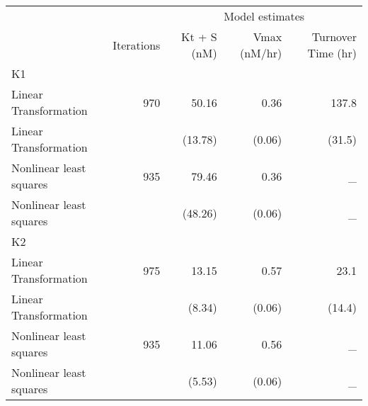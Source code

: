 \captionsetup[table]{labelformat=empty,skip=1pt}
\begin{longtable}{lrrrr}
\toprule
& & \multicolumn{3}{c}{Model estimates} \\ 
 \cmidrule(lr){3-5}
 & Iterations & Kt + S (nM) & Vmax (nM/hr) & Turnover Time (hr) \\ 
\midrule
\multicolumn{1}{l}{K1} \\ 
\midrule
Linear Transformation & 970 & 50.16 & 0.36 & 137.8 \\ 
Linear Transformation &  & (13.78) & (0.06) & (31.5) \\ 
Nonlinear least squares & 935 & 79.46 & 0.36 & _ \\ 
Nonlinear least squares &  & (48.26) & (0.06) & _ \\ 
\midrule
\multicolumn{1}{l}{K2} \\ 
\midrule
Linear Transformation & 975 & 13.15 & 0.57 & 23.1 \\ 
Linear Transformation &  & (8.34) & (0.06) & (14.4) \\ 
Nonlinear least squares & 935 & 11.06 & 0.56 & _ \\ 
Nonlinear least squares &  & (5.53) & (0.06) & _ \\ 
\bottomrule
\end{longtable}

